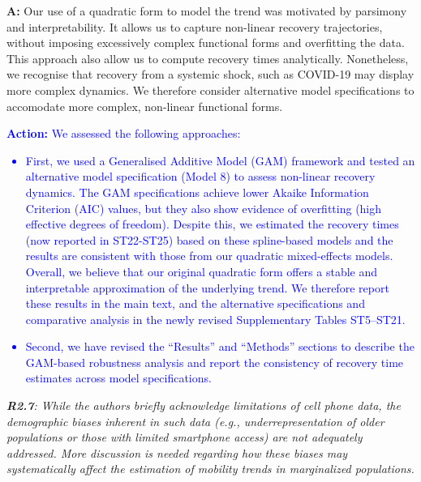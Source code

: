 \documentclass[12pt,a4paper,oneside, reqno]{amsart}
\begin{document}
\setlength{\leftskip}{1cm}\textbf{A:}  Our use of a quadratic form to model the trend was motivated by parsimony and interpretability. It allows us to capture non-linear recovery trajectories, without imposing excessively complex functional forms and overfitting the data. This approach also allow us to compute recovery times analytically. Nonetheless, we recognise that recovery from a systemic shock, such as COVID-19 may display more complex dynamics. We therefore consider alternative model specifications to accomodate more complex, non-linear functional forms.

\textcolor{blue}{
\textbf{Action:} We assessed the following approaches:
\begin{itemize}[noitemsep, topsep=0pt]
    \item First, we used a Generalised Additive Model (GAM) framework and tested an alternative model specification (Model 8) to assess non-linear recovery dynamics. The GAM specifications achieve lower Akaike Information Criterion (AIC) values, but they also show evidence of overfitting (high effective degrees of freedom). Despite this, we estimated the recovery times (now reported in ST22-ST25) based on these spline-based models and the results are consistent with those from our quadratic mixed-effects models. Overall, we believe that our original quadratic form offers a stable and interpretable approximation of the underlying trend. We therefore report these results in the main text, and the alternative specifications and comparative analysis in the newly revised Supplementary Tables ST5–ST21.
    \item Second, we have revised the ``Results'' and ``Methods'' sections to describe the GAM-based robustness analysis and report the consistency of recovery time estimates across model specifications.
\end{itemize}
}

\setlength{\leftskip}{0cm} \textit{\textbf{R2.7}: While the authors briefly acknowledge limitations of cell phone data, the demographic biases inherent in such data (e.g., underrepresentation of older populations or those with limited smartphone access) are not adequately addressed. More discussion is needed regarding how these biases may systematically affect the estimation of mobility trends in marginalized populations.}
 
\end{document}
